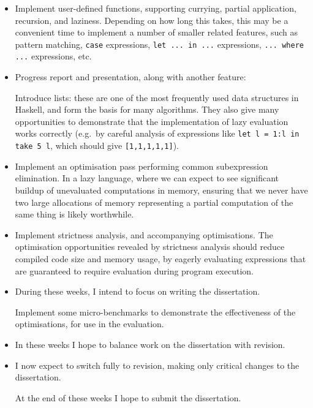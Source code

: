 \documentclass[12pt]{article}
\newcommand\haskell[1]{\texttt{#1}}
\begin{document}
\begin{itemize}
{    This week is a slack week, to catch up on anything that fell behind, or to spend time cleaning up any parts of the
    existing implementation that are messy/fragile/poorly designed.
}
\item
{

    Implement user-defined functions, supporting currying, partial application, recursion, and laziness. Depending on
    how long this takes, this may be a convenient time to implement a number of smaller related features, such as
    pattern matching, \haskell{case} expressions, \haskell{let ... in ...} expressions, \haskell{... where ...}
    expressions, etc.
}
\item
{

    Progress report and presentation, along with another feature:

    Introduce lists: these are one of the most frequently used data structures in Haskell, and form the basis for many
    algorithms. They also give many opportunities to demonstrate that the implementation of lazy evaluation works
    correctly (e.g.\ by careful analysis of expressions like \haskell{let l = 1:l in take 5 l}, which should give
    \haskell{[1,1,1,1,1]}).
}
\item
{

    Implement an optimisation pass performing common subexpression elimination. In a lazy language, where we can expect
    to see significant buildup of unevaluated computations in memory, ensuring that we never have two large allocations
    of memory representing a partial computation of the same thing is likely worthwhile.

}
\item
{

    Implement strictness analysis, and accompanying optimisations. The optimisation opportunities revealed by
    strictness analysis should reduce compiled code size and memory usage, by eagerly evaluating expressions that are
    guaranteed to require evaluation during program execution.
}
\item
{

    During these weeks, I intend to focus on writing the dissertation.

    Implement some micro-benchmarks to demonstrate the effectiveness of the optimisations, for use in the evaluation.
}
\item
{

    In these weeks I hope to balance work on the dissertation with revision.
}
\item
{

    I now expect to switch fully to revision, making only critical changes to the dissertation.

    At the end of these weeks I hope to submit the dissertation.
}
\end{itemize}
\end{document}
